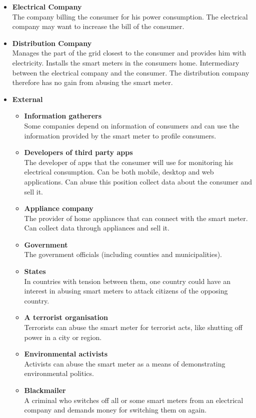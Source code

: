 \begin{itemize}
\item \textbf{Electrical Company}\\
The company billing the consumer for his power consumption.
The electrical company may want to increase the bill of the consumer.
\item \textbf{Distribution Company}\\
Manages the part of the grid closest to the consumer and provides him with electricity.
Installs the smart meters in the consumers home.
Intermediary between the electrical company and the consumer.
The distribution company therefore has no gain from abusing the smart meter.
\item \textbf{External}
\begin{itemize}
\item \textbf{Information gatherers}\\ 
Some companies depend on information of consumers and can use the information provided by the smart meter to profile consumers.
\item \textbf{Developers of third party apps}\\
The developer of apps that the consumer will use for monitoring his electrical consumption. 
Can be both mobile, desktop and web applications.
Can abuse this position collect data about the consumer and sell it.
\item \textbf{Appliance company}\\ The provider of home appliances that can connect with the smart meter.
Can collect data through appliances and sell it.
\item \textbf{Government}\\
The government officials (including counties and municipalities).
\item \textbf{States}\\ In countries with tension between them, one country could have an interest in abusing smart meters to attack citizens of the opposing country.
\item \textbf{A terrorist organisation}\\ Terrorists can abuse the smart meter for terrorist acts, like shutting off power in a city or region.
\item \textbf{Environmental activists}\\ Activists can abuse the smart meter as a means of demonstrating environmental politics.
\item \textbf{Blackmailer}\\ A criminal who switches off all or some smart meters from an electrical company and demands money for switching them on again.
\end{itemize}
\end{itemize}

